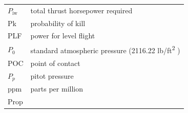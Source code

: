 \documentclass[
]{book}
\begin{document}
\begin{longtable}[]{@{}ll@{}}
\begin{minipage}[t]{0.47\columnwidth}
\(P_{\mathrm{iw}}\)\strut
\end{minipage} & \begin{minipage}[t]{0.47\columnwidth}\raggedright
total thrust horsepower required\strut
\end{minipage}\tabularnewline
\begin{minipage}[t]{0.47\columnwidth}\raggedright
Pk\strut
\end{minipage} & \begin{minipage}[t]{0.47\columnwidth}\raggedright
probability of kill\strut
\end{minipage}\tabularnewline
\begin{minipage}[t]{0.47\columnwidth}\raggedright
PLF\strut
\end{minipage} & \begin{minipage}[t]{0.47\columnwidth}\raggedright
power for level flight\strut
\end{minipage}\tabularnewline
\begin{minipage}[t]{0.47\columnwidth}\raggedright
\(P_0\)\strut
\end{minipage} & \begin{minipage}[t]{0.47\columnwidth}\raggedright
standard atmospheric pressure (2116.22 lb/ft\textsuperscript{2} )\strut
\end{minipage}\tabularnewline
\begin{minipage}[t]{0.47\columnwidth}\raggedright
POC\strut
\end{minipage} & \begin{minipage}[t]{0.47\columnwidth}\raggedright
point of contact\strut
\end{minipage}\tabularnewline
\begin{minipage}[t]{0.47\columnwidth}\raggedright
\(P_p\)\strut
\end{minipage} & \begin{minipage}[t]{0.47\columnwidth}\raggedright
pitot pressure\strut
\end{minipage}\tabularnewline
\begin{minipage}[t]{0.47\columnwidth}\raggedright
ppm\strut
\end{minipage} & \begin{minipage}[t]{0.47\columnwidth}\raggedright
parts per million\strut
\end{minipage}\tabularnewline
\begin{minipage}[t]{0.47\columnwidth}\raggedright
Prop\strut
\end{minipage} & \begin{minipage}[t]{0.47\columnwidth}\raggedright

\end{minipage}
\end{longtable}
\end{document}
